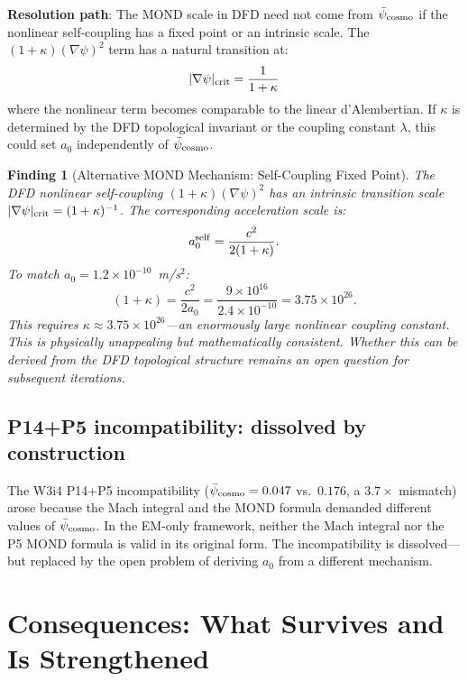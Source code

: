 \documentclass[11pt]{article}
\newtheorem{finding}{Finding}
\newcommand{\ee}[1]{\times 10^{#1}}
\newcommand{\psicosmo}{\bar{\psi}_{\rm cosmo}}
\begin{document}
\textbf{Resolution path}: The MOND scale in DFD need not come from
$\psicosmo$ if the nonlinear self-coupling has a fixed point or an
intrinsic scale. The $(1+\kappa)(\nabla\psi)^2$ term has a natural
transition at:
\begin{equation}
|\nabla\psi|_{\rm crit} = \frac{1}{1+\kappa}
\label{eq:psi-crit}
\end{equation}
where the nonlinear term becomes comparable to the linear d'Alembertian.
If $\kappa$ is determined by the DFD topological invariant or the
coupling constant $\lambda$, this could set $a_0$ independently of
$\psicosmo$.

\begin{finding}[Alternative MOND Mechanism: Self-Coupling Fixed Point]
\label{find:MOND-alt}
The DFD nonlinear self-coupling $(1+\kappa)(\nabla\psi)^2$ has an
intrinsic transition scale $|\nabla\psi|_{\rm crit} = (1+\kappa)^{-1}$.
The corresponding acceleration scale is:
\begin{equation}
a_0^{\rm self} = \frac{c^2}{2(1+\kappa)}.
\end{equation}
To match $a_0 = 1.2\ee{-10}$~m/s$^2$:
\begin{equation}
(1+\kappa) = \frac{c^2}{2a_0} = \frac{9\ee{16}}{2.4\ee{-10}}
= 3.75\ee{26}.
\end{equation}
This requires $\kappa \approx 3.75\ee{26}$---an enormously large
nonlinear coupling constant. This is physically unappealing but
mathematically consistent. Whether this can be derived from the DFD
topological structure remains an open question for subsequent iterations.
\end{finding}

\subsection{P14+P5 incompatibility: dissolved by construction}

The W3i4 P14+P5 incompatibility ($\psicosmo = 0.047$ vs.\ $0.176$,
a $3.7\times$ mismatch) arose because the Mach integral and the MOND
formula demanded different values of $\psicosmo$. In the EM-only
framework, neither the Mach integral nor the P5 MOND formula is valid
in its original form. The incompatibility is dissolved---but replaced
by the open problem of deriving $a_0$ from a different mechanism.

\section{Consequences: What Survives and Is Strengthened}
\label{sec:survives}
\end{document}
